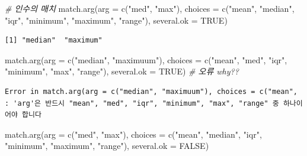 \documentclass[
  11pt,
]{krantz}
\newenvironment{Shaded}{\begin{snugshade}}{\end{snugshade}}
\newcommand{\AttributeTok}[1]{\textcolor[rgb]{0.61,0.61,0.61}{#1}}
\newcommand{\CommentTok}[1]{\textcolor[rgb]{0.37,0.37,0.37}{\textit{#1}}}
\newcommand{\ConstantTok}[1]{\textcolor[rgb]{0,0,0}{#1}}
\newcommand{\FunctionTok}[1]{\textcolor[rgb]{0,0,0}{#1}}
\newcommand{\NormalTok}[1]{#1}
\newcommand{\StringTok}[1]{\textcolor[rgb]{0.5,0.5,0.5}{#1}}
\begin{document}
\footnotesize

\begin{Shaded}
\begin{Highlighting}[]
\CommentTok{\# 인수의 매치}
\FunctionTok{match.arg}\NormalTok{(}\AttributeTok{arg =} \FunctionTok{c}\NormalTok{(}\StringTok{"med"}\NormalTok{, }\StringTok{"max"}\NormalTok{), }
          \AttributeTok{choices =} \FunctionTok{c}\NormalTok{(}\StringTok{"mean"}\NormalTok{, }\StringTok{"median"}\NormalTok{, }\StringTok{"iqr"}\NormalTok{, }\StringTok{"minimum"}\NormalTok{, }\StringTok{"maximum"}\NormalTok{, }\StringTok{"range"}\NormalTok{), }
          \AttributeTok{several.ok =} \ConstantTok{TRUE}\NormalTok{)}
\end{Highlighting}
\end{Shaded}

\begin{verbatim}
[1] "median"  "maximum"
\end{verbatim}

\begin{Shaded}
\begin{Highlighting}[]
\FunctionTok{match.arg}\NormalTok{(}\AttributeTok{arg =} \FunctionTok{c}\NormalTok{(}\StringTok{"median"}\NormalTok{, }\StringTok{"maximuum"}\NormalTok{), }
          \AttributeTok{choices =} \FunctionTok{c}\NormalTok{(}\StringTok{"mean"}\NormalTok{, }\StringTok{"med"}\NormalTok{, }\StringTok{"iqr"}\NormalTok{, }\StringTok{"minimum"}\NormalTok{, }\StringTok{"max"}\NormalTok{, }\StringTok{"range"}\NormalTok{), }
          \AttributeTok{several.ok =} \ConstantTok{TRUE}\NormalTok{) }\CommentTok{\# 오류 why??}
\end{Highlighting}
\end{Shaded}

\begin{verbatim}
Error in match.arg(arg = c("median", "maximuum"), choices = c("mean", : 'arg'은 반드시 "mean", "med", "iqr", "minimum", "max", "range" 중 하나이어야 합니다
\end{verbatim}

\begin{Shaded}
\begin{Highlighting}[]
\FunctionTok{match.arg}\NormalTok{(}\AttributeTok{arg =} \FunctionTok{c}\NormalTok{(}\StringTok{"med"}\NormalTok{, }\StringTok{"max"}\NormalTok{), }
          \AttributeTok{choices =} \FunctionTok{c}\NormalTok{(}\StringTok{"mean"}\NormalTok{, }\StringTok{"median"}\NormalTok{, }\StringTok{"iqr"}\NormalTok{, }\StringTok{"minimum"}\NormalTok{, }\StringTok{"maximum"}\NormalTok{, }\StringTok{"range"}\NormalTok{), }
          \AttributeTok{several.ok =} \ConstantTok{FALSE}\NormalTok{)}
\end{Highlighting}
\end{Shaded}
\end{document}
